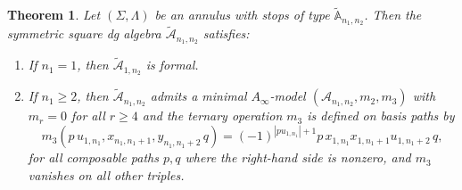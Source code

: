 \documentclass[a4paper, reqno, 11pt]{amsart}
\newtheorem{theorem}{Theorem}[section]
\theoremstyle{definition}
\begin{document}
\begin{theorem}\label{thm:A_infty_qiso}
	Let $(\Sigma, \Lambda)$ be an annulus with stops of type
	$\widetilde{\mathbb{A}}_{n_1,n_2}$. Then the symmetric square dg algebra
	$\widetilde{\mathcal A}_{n_1,n_2}$ satisfies:
	\begin{enumerate}
		\item If $n_1=1$, then $\widetilde{\mathcal A}_{1,n_2}$ is formal.
		\item If $n_1\ge 2$, then $\widetilde{\mathcal A}_{n_1,n_2}$ admits a
		minimal $A_\infty$-model $(\mathcal A_{n_1,n_2}, m_2, m_3)$ with
		$m_r=0$ for all $r\ge4$ and the ternary operation \(m_3\) is defined on basis paths by
		\[
		m_3(p\,u_{1,n_1}, x_{n_1,n_1+1}, y_{n_1,n_1+2}\,q)
		=(-1)^{|pu_{1,n_1}|+1} p\, x_{1,n_1} x_{1,n_1+1} u_{1,n_1+2}\, q,
		\]
		for all composable paths $p,q$ where the right-hand side is nonzero, and $m_3$ vanishes on all other triples. 
	\end{enumerate}
\end{theorem}
\end{document}
